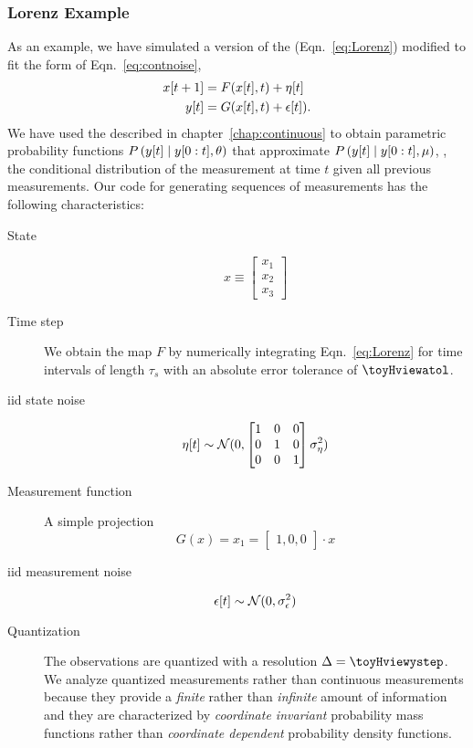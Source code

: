 \subsubsection{Lorenz Example}

As an example, we have simulated a version of the %
 (Eqn.~\eqref{eq:Lorenz}) modified to fit the
form of Eqn.~\eqref{eq:contnoise},
\begin{align*}
  {x}{[t+1]} &= F({x}{[t]},t) + {\eta}{[t]}\\
  {y}{[t]}   &= G({x}{[t]},t) + {\epsilon}{[t]}).
\end{align*}
We have used the  described in
chapter~\ref{chap:continuous} to obtain parametric probability
functions $P\left({y}{[t]}\mid y[0:t] , \theta \right)$ that
approximate $P\left({y}{[t]}\mid y[0:t], \mu \right)$, \ie, the
conditional distribution of the measurement at time $t$ given all
previous measurements.  Our code for generating sequences of
measurements has the following characteristics:
  \begin{description}
  \item[State] 
    \begin{equation*}
      x \equiv 
      \begin{bmatrix}
        x_1\\x_2\\x_3
      \end{bmatrix}
    \end{equation*}
  \item[Time step] We obtain the map $F$ by numerically integrating
    Eqn.~\eqref{eq:Lorenz} for time intervals of length $\tau_s$ with an
    absolute error tolerance of $\toyHviewatol$.
  \item[iid state noise] 
    \begin{equation*}
      {\eta}{[t]} \sim {\mathcal{N}}(0, \begin{bmatrix} 1 & 0 & 0\\0 & 1 &
        0\\0&0&1 \end{bmatrix} \sigma_\eta^2)
    \end{equation*}
  \item[Measurement function] A simple projection
    \begin{equation*}
      G(x) = x_1 = \begin{bmatrix} 1,0,0 \end{bmatrix} \cdot x
    \end{equation*}
  \item[iid measurement noise] 
    \begin{equation*}
      {\epsilon}{[t]} \sim {\mathcal{N}}(0, \sigma_\epsilon^2)
    \end{equation*}
  \item[Quantization] The observations are quantized with a resolution
    $\Delta=\toyHviewystep$.  We analyze quantized measurements rather than
    continuous measurements because they provide a \emph{finite} rather
    than \emph{infinite} amount of information and they are
    characterized by \emph{coordinate invariant} probability mass
    functions rather than \emph{coordinate dependent} probability
    density functions.
\end{description}
